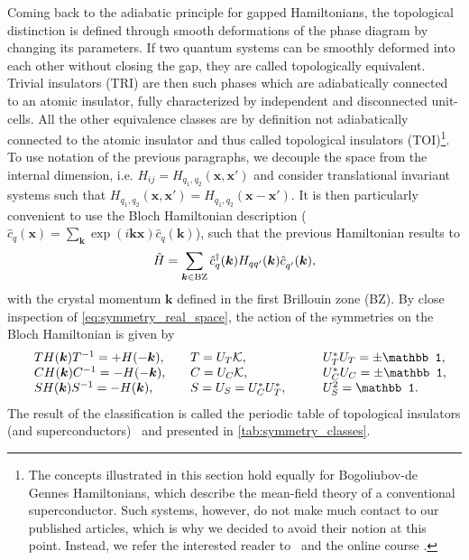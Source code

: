Coming back to the adiabatic principle for gapped Hamiltonians, the topological distinction is defined through smooth deformations of the phase diagram by changing its parameters.
If two quantum systems can be smoothly deformed into each other without closing the gap, they are called topologically equivalent.
Trivial insulators (TRI) are then such phases which are adiabatically connected to an atomic insulator, fully characterized by independent and disconnected unit-cells.
All the other equivalence classes are by definition not adiabatically connected to the atomic insulator and thus called topological insulators (TOI)\footnote{The concepts illustrated in this section hold equally for Bogoliubov-de Gennes Hamiltonians, which describe the mean-field theory of a conventional superconductor. Such systems, however, do not make much contact to our published articles, which is why we decided to avoid their notion at this point. Instead, we refer the interested reader to~\cite{Chiu2016,Asboth2016} and the online course \cite{topocondmat}.}.
To use notation of the previous paragraphs, we decouple the space from the internal dimension, i.e. $H_{ij}=H_{q_1,q_2}(\bm x,\bm x')$ and consider translational invariant systems such that $H_{q_1,q_2}(\bm x,\bm x')=H_{q_1,q_2}(\bm x-\bm x')$.
It is then particularly convenient to use the Bloch Hamiltonian description ($\hat c_q(\bm x)=\sum_{\bm k}\exp(i\bm k\bm x)\hat c_q(\bm k)$), such that the previous Hamiltonian results to
\begin{align}
    \hat H = \sum_{\bm k\in {\rm BZ}} \hat c^\dag_q(\bm k) H_{qq'}(\bm k)\hat c^\pdag_{q'}(\bm k),
\end{align}
with the crystal momentum $\bm k$ defined in the first Brillouin zone (BZ).
By close inspection of \cref{eq:symmetry_real_space}, the action of the symmetries on the Bloch Hamiltonian is given by
\begin{align}
    \begin{array}{l l l l }
        & TH(\bm k)T^{-1} = +H(-\bm k)
        ,\quad
        & T = U_T\mathcal K
        ,\quad
        & U_T^*U_T = \pm\mathbb1,\\
        & CH(\bm k)C^{-1} = -H(-\bm k)
        ,\quad
        & C = U_C\mathcal K
        ,\quad
        & U_C^*U_C = \pm\mathbb1,\\
        & SH(\bm k)S^{-1} = -H(\bm k)
        ,\quad
        & S = U_S = U_C^* U^*_T
        ,\qquad
        & U_S^2 = \mathbb1.
    \end{array}
    \label{eq:symmetry_momentum_space}
\end{align}
The result of the classification is called the periodic table of topological insulators (and superconductors)~\cite{Kitaev2009,Qi2008,Ryu2010,Schnyder2008} and presented in \cref{tab:symmetry_classes}.

